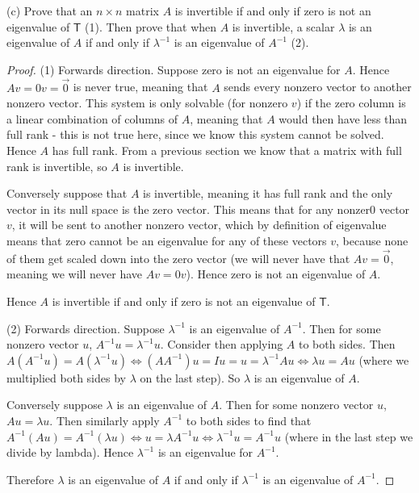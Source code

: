 \documentclass[11pt]{article}
\begin{document}
(c) Prove that an $n\times n$ matrix $A$ is invertible if and only if zero is not an eigenvalue of $\mathsf{T}$ (1). Then prove that when $A$ is invertible, a scalar $\lambda$ is an eigenvalue of $A$ if and only if $\lambda^{-1}$ is an eigenvalue of $A^{-1}$ (2).

\begin{proof}
   (1) Forwards direction. Suppose zero is not an eigenvalue for $A$. Hence $Av = 0v = \vec{0}$ is never true, meaning that $A$ sends every nonzero vector to another nonzero vector. This system is only solvable (for nonzero $v$) if the zero column is a linear combination of columns of $A$, meaning that $A$ would then have less than full rank - this is not true here, since we know this system cannot be solved. Hence $A$ has full rank. From a previous section we know that a matrix with full rank is invertible, so $A$ is invertible.

  Conversely suppose that $A$ is invertible, meaning it has full rank and the only vector in its null space is the zero vector. This means that for any nonzer0 vector $v$, it will be sent to another nonzero vector, which by definition of eigenvalue means that zero cannot be an eigenvalue for any of these vectors $v$, because none of them get scaled down into the zero vector (we will never have that $Av = \vec{0}$, meaning we will never have $Av = 0v$). Hence zero is not an eigenvalue of $A$.

  Hence $A$ is invertible if and only if zero is not an eigenvalue of $\mathsf{T}$.

  (2) Forwards direction. Suppose $\lambda^{-1}$ is an eigenvalue of $A^{-1}$. Then for some nonzero vector $u$, $A^{-1}u = \lambda^{-1}u$. Consider then applying $A$ to both sides. Then $A(A^{-1}u) = A(\lambda^{-1}u) \iff (AA^{-1})u = Iu = u = \lambda^{-1}Au \iff \lambda u = Au$ (where we multiplied both sides by $\lambda$ on the last step). So $\lambda$ is an eigenvalue of $A$.

  Conversely suppose $\lambda$ is an eigenvalue of $A$. Then for some nonzero vector $u$, $Au = \lambda u$. Then similarly apply $A^{-1}$ to both sides to find that $A^{-1}(Au) = A^{-1}(\lambda u) \iff u = \lambda A^{-1}u \iff \lambda^{-1} u = A^{-1}u$ (where in the last step we divide by lambda). Hence $\lambda^{-1}$ is an eigenvalue for $A^{-1}$.

  Therefore $\lambda$ is an eigenvalue of $A$ if and only if $\lambda^{-1}$ is an eigenvalue of $A^{-1}$.
\end{proof}
\end{document}
